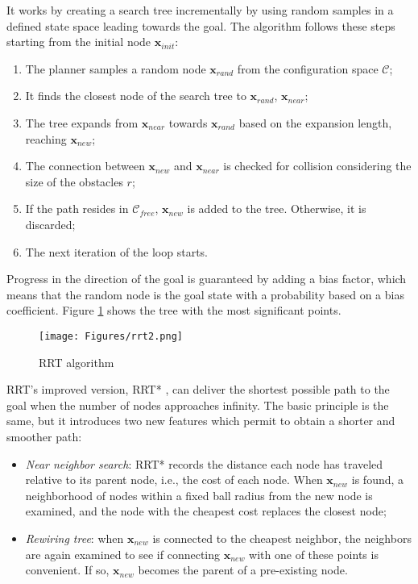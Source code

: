 It works by creating a search tree incrementally by using random samples in a defined state space leading towards the goal. The algorithm follows these steps starting from the initial node $\mathbf{x}_{init}$:
\begin{enumerate}[itemsep=0pt]
	\item The planner samples a random node $\mathbf{x}_{rand}$ from the configuration space $\mathcal{C}$;
	\item It finds the closest node of the search tree to $\mathbf{x}_{rand}$, $\mathbf{x}_{near}$;
	\item The tree expands from $\mathbf{x}_{near}$ towards $\mathbf{x}_{rand}$ based on the expansion length, reaching $\mathbf{x}_{new}$;
	\item The connection between $\mathbf{x}_{new}$ and $\mathbf{x}_{near}$ is checked for collision considering the size of the obstacles $r$;
	\item If the path resides in $\mathcal{C}_{free}$, $\mathbf{x}_{new}$ is added to the tree. Otherwise, it is discarded;
	\item The next iteration of the loop starts.
\end{enumerate} 
Progress in the direction of the goal is guaranteed by adding a bias factor, which means that the random node is the goal state with a probability based on a bias coefficient. Figure \ref{rrt} shows the tree with the most significant points.
\begin{figure}[H]
	\centering
	\texttt{[image: Figures/rrt2.png]}
	\caption{RRT algorithm}
	\label{rrt}
\end{figure}

RRT's improved version, RRT* \cite{karaman2011sampling}, can deliver the shortest possible path to the goal when the number of nodes approaches infinity. The basic principle is the same, but it introduces two new features which permit to obtain a shorter and smoother path:
\begin{itemize}
	\item \textit{Near neighbor search}: RRT* records the distance each node has traveled relative to its parent node, i.e., the cost of each node. When $\mathbf{x}_{new}$ is found, a neighborhood of nodes within a fixed ball radius from the new node is examined, and the node with the cheapest cost replaces the closest node;
	\item \textit{Rewiring tree}: when $\mathbf{x}_{new}$ is connected to the cheapest neighbor, the neighbors are again examined to see if connecting $\mathbf{x}_{new}$ with one of these points is convenient. If so, $\mathbf{x}_{new}$ becomes the parent of a pre-existing node.
\end{itemize} 

